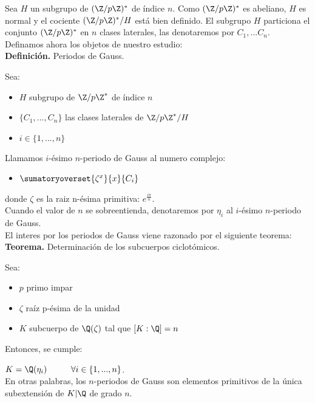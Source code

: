 \documentclass[a5paper]{article}
\begin{document}
{
Sea $H$ un subgrupo de $(\Z/p\Z)^*$ de índice $n$. Como $(\Z/p\Z)^*$ es abeliano, $H$ es normal y el cociente $(\Z/p\Z)^*/H$ está bien definido. El subgrupo $H$ particiona el conjunto $(\Z/p\Z)^*$ en $n$ clases laterales, las denotaremos por $C_1,...C_n$.\\
Definamos ahora los objetos de nuestro estudio:\\
{\bf Definición.} Periodos de Gauss.

Sea:
\begin{itemize}
\item $H$ subgrupo de $\Z/p\Z^*$ de índice $n$
\item $\{C_1,...,C_n\}$ las clases laterales de $\Z/p\Z^*/H$
\item $i \in \{1,...,n\}$

\end{itemize}
Llamamos $i$-ésimo $n$-periodo de Gauss al numero complejo:
\begin{itemize}
\item $\sumatoryoverset{\zeta^x}{x}{C_i}$
\end{itemize}
donde $\zeta$ es la raiz n-ésima primitiva: $e^{\frac{i\pi}{n}}$.\\
Cuando el valor de $n$ se sobreentienda, denotaremos por $\eta_i$ al $i$-ésimo $n$-periodo de Gauss.\\
El interes por los periodos de Gauss viene razonado por el siguiente teorema:\\
{\bf Teorema.} Determinación de los subcuerpos ciclotómicos.

Sea:
\begin{itemize}
\item $p$ primo impar
\item $\zeta$ raíz p-ésima de la unidad
\item $K$ subcuerpo de $\Q(\zeta)$ tal que $[K:\Q] = n$
\end{itemize}
Entonces, se cumple:

$ K = \Q(\eta_i) \hspace{1cm}	\forall i \in \{1,...,n\}$.\\
En otras palabras, los $n$-periodos de Gauss son elementos primitivos de la única subextensión de $K|\Q$ de grado $n$.

}
\newpage
\end{document}
